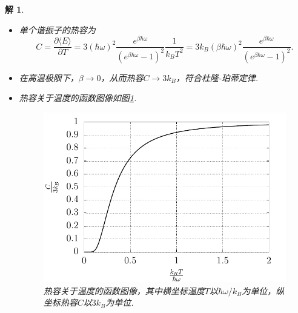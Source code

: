 \documentclass[UTF8,10pt,a4paper]{article}
\theoremstyle{Problem}
\theoremstyle{Solution}
\newtheorem*{sol}{解}
\begin{document}
\begin{sol}
\begin{enumerate}
\begin{itemize}
                        \begin{equation}
                            \langle E\rangle=3\hbar\omega\left(\langle n\rangle+\frac{1}{2}\right)
                        \end{equation}
                  \item[$\triangleright$] 单个谐振子的热容为
                        \begin{equation}
                            C=\frac{\partial\langle E\rangle}{\partial T}=3(\hbar\omega)^2\frac{e^{\beta\hbar\omega}}{\left(e^{\beta\hbar\omega}-1\right)^2}\frac{1}{k_BT^2}=3k_B(\beta\hbar\omega)^2\frac{e^{\beta\hbar\omega}}{\left(e^{\beta\hbar\omega}-1\right)^2}.
                        \end{equation}
                  \item[$\triangleright$] 在高温极限下，$\beta\rightarrow 0$，从而热容$C\rightarrow 3k_B$，符合杜隆-珀蒂定律.
                  \item[$\triangleright$] 热容关于温度的函数图像如图\ref{1-C-T}.
                        \begin{figure}[h]
                            \centering
                            \includegraphics[width=.5\textwidth]{1-C-T.pdf}
                            \caption{热容关于温度的函数图像，其中横坐标温度$T$以$\hbar\omega/k_B$为单位，纵坐标热容$C$以$3k_B$为单位.}
                            \label{1-C-T}
                        \end{figure}
              \end{itemize}
    \end{enumerate}
\end{sol}
\end{document}
